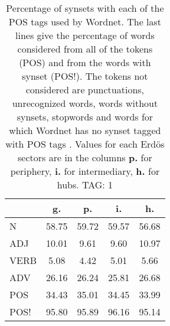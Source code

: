\begin{table}[h!]
\begin{center}
\begin{tabular}{| l || c | c | c | c |}\hline
 & {\bf g.} & {\bf p.} & {\bf i.} & {\bf h.} \\\hline\hline
N & 58.75  & 59.72  & 59.57  & 56.68 \\\hline
ADJ & 10.01  & 9.61  & 9.60  & 10.97 \\\hline
VERB & 5.08  & 4.42  & 5.01  & 5.66 \\\hline
ADV & 26.16  & 26.24  & 25.81  & 26.68 \\\hline\hline
POS & 34.43  & 35.01  & 34.45  & 33.99 \\\hline
POS! & 95.80  & 95.89  & 96.16  & 95.14 \\\hline
\end{tabular}
\caption{Percentage of synsets with each of the POS tags used by Wordnet. The last lines give the percentage of words considered from all of the tokens (POS) and from the words with synset (POS!). The tokens not considered are punctuations, unrecognized words, words without synsets, stopwords and words for which Wordnet has no synset  tagged with POS tags . Values for each Erd\"os sectors are in the columns {{\bf p.}} for periphery, {{\bf i.}} for intermediary, {{\bf h.}} for hubs. TAG: 1}
\end{center}
\end{table}